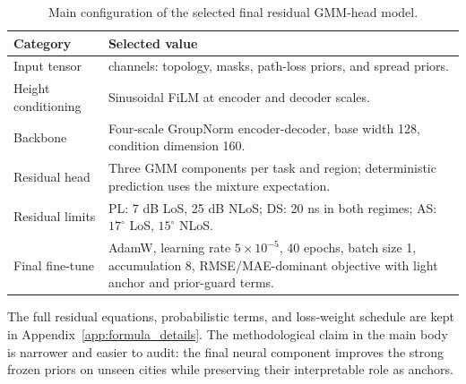 \begin{table}[H]
\centering
\caption{Main configuration of the selected final residual GMM-head model.}
\label{tab:try80_config_main}
\footnotesize
\setlength{\tabcolsep}{5pt}
\renewcommand{\arraystretch}{1.14}
\begin{tabularx}{\textwidth}{@{}>{\raggedright\arraybackslash}p{}>{\raggedright\arraybackslash}X@{}}
\toprule
Category & Selected value \\ \midrule
Input tensor & 9 channels: topology, masks, path-loss priors, and spread priors. \\
Height conditioning & Sinusoidal FiLM at encoder and decoder scales. \\
Backbone & Four-scale GroupNorm encoder-decoder, base width 128, condition dimension 160. \\
Residual head & Three GMM components per task and region; deterministic prediction uses the mixture expectation. \\
Residual limits & PL: 7 dB LoS, 25 dB NLoS; DS: 20 ns in both regimes; AS: \(17^\circ\) LoS, \(15^\circ\) NLoS. \\
Final fine-tune & AdamW, learning rate \(5\times10^{-5}\), 40 epochs, batch size 1, accumulation 8, RMSE/MAE-dominant objective with light anchor and prior-guard terms. \\
\bottomrule
\end{tabularx}
\end{table}

The full residual equations, probabilistic terms, and loss-weight schedule are
kept in Appendix~\ref{app:formula_details}. The methodological claim in the
main body is narrower and easier to audit: the final neural component improves
the strong frozen priors on unseen cities while preserving their interpretable
role as anchors.
